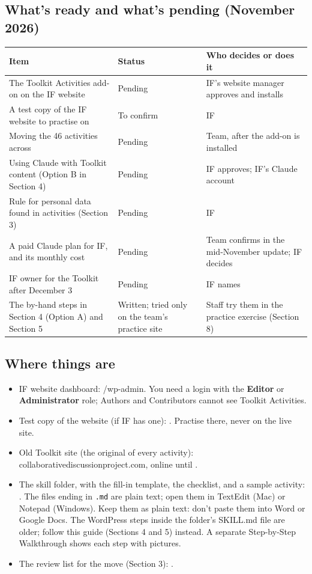 \subsection*{What's ready and what's pending (November 2026)}
\begin{tabularx}{\textwidth}{@{}LP{2.2cm}P{3.6cm}@{}}
\toprule
\textbf{Item} & \textbf{Status} & \textbf{Who decides or does it} \\
\midrule
The Toolkit Activities add-on on the IF website & Pending & IF's website manager approves and installs \\
A test copy of the IF website to practise on & To confirm & IF \\
Moving the 46 activities across & Pending & Team, after the add-on is installed \\
Using Claude with Toolkit content (Option B in Section 4) & Pending & IF approves; IF's Claude account \\
Rule for personal data found in activities (Section 3) & Pending & IF \\
A paid Claude plan for IF, and its monthly cost & Pending & Team confirms in the mid-November update; IF decides \\
IF owner for the Toolkit after December 3 & Pending & IF names \\
The by-hand steps in Section 4 (Option A) and Section 5 & Written; tried only on the team's practice site & Staff try them in the practice exercise (Section 8) \\
\bottomrule
\end{tabularx}

\subsection*{Where things are}
\begin{itemize}
  \item IF website dashboard: /wp-admin. You need a login with the \textbf{Editor} or \textbf{Administrator} role; Authors and Contributors cannot see Toolkit Activities.
  \item Test copy of the website (if IF has one): . Practise there, never on the live site.
  \item Old Toolkit site (the original of every activity): collaborativediscussionproject.com, online until .
  \item The skill folder, with the fill-in template, the checklist, and a sample activity: . The files ending in \texttt{.md} are plain text; open them in TextEdit (Mac) or Notepad (Windows). Keep them as plain text: don't paste them into Word or Google Docs. The WordPress steps inside the folder's SKILL.md file are older; follow this guide (Sections 4 and 5) instead. A separate Step-by-Step Walkthrough shows each step with pictures.
  \item The review list for the move (Section 3): .
\end{itemize}

